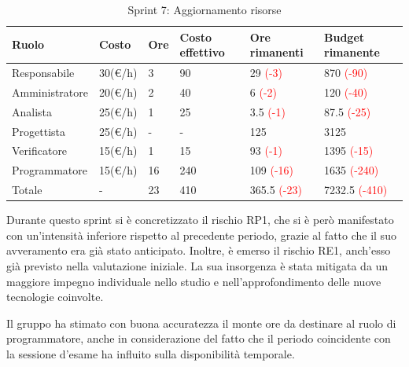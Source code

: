 \begin{table}[H]
	\centering
	\begin{tabular}{|p{}|p{}|p{}|p{}|p{}|p{}|}
		\hline
		\rowcolor{gray!25}
		Ruolo & Costo & Ore & Costo \newline effettivo & Ore \newline rimanenti & Budget \newline rimanente \\ \hline
		
		Responsabile
		& 30(€/h) & 3 & 90
		& 29 \textcolor{red}{(-3)}
		& 870 \textcolor{red}{(-90)} \\ \hline
		
		Amministratore
		& 20(€/h) & 2 & 40
		& 6 \textcolor{red}{(-2)}
		& 120 \textcolor{red}{(-40)} \\ \hline
		
		Analista
		& 25(€/h) & 1 & 25
		& 3.5 \textcolor{red}{(-1)}
		& 87.5 \textcolor{red}{(-25)} \\ \hline
		
		Progettista
		& 25(€/h) & - & -
		& 125
		& 3125 \\ \hline
		
		Verificatore
		& 15(€/h) & 1 & 15
		& 93 \textcolor{red}{(-1)}
		& 1395 \textcolor{red}{(-15)} \\ \hline
		
		Programmatore
		& 15(€/h) & 16 & 240
		& 109 \textcolor{red}{(-16)}
		& 1635 \textcolor{red}{(-240)} \\ \hline
		
		Totale
		& - & 23 & 410
		& 365.5 \textcolor{red}{(-23)}
		& 7232.5 \textcolor{red}{(-410)} \\ \hline
	\end{tabular}
	\caption{Sprint 7: Aggiornamento risorse}
\end{table}

Durante questo sprint si è concretizzato il rischio RP1, che si è però manifestato con un'intensità inferiore rispetto al precedente periodo, grazie al fatto che il suo avveramento era già stato anticipato.
Inoltre, è emerso il rischio RE1, anch'esso già previsto nella valutazione iniziale. La sua insorgenza è stata mitigata da un maggiore impegno individuale nello studio e nell'approfondimento delle nuove tecnologie coinvolte.

Il gruppo ha stimato con buona accuratezza il monte ore da destinare al ruolo di programmatore, anche in considerazione del fatto che il periodo coincidente con la sessione d'esame ha influito sulla disponibilità temporale.


